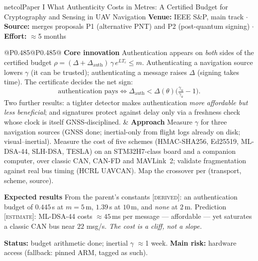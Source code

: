 \documentclass[10pt,a4paper]{article}
\newcommand{\hd}[1]{\textcolor{netcol}{\textbf{#1}}\enspace}
\newcommand{\prov}[1]{\textsc{\footnotesize[#1]}}
\begin{document}
\begin{card}{netcol}{Paper I}
  {What Authenticity Costs in Metres: A Certified Budget for Cryptography and
   Sensing in UAV Navigation}
  {}
\textbf{Venue:} IEEE S\&P, main track \enspace$\cdot$\enspace
\textbf{Source:} merges proposals P1 (alternative PNT) and P2 (post-quantum
signing) \enspace$\cdot$\enspace \textbf{Effort:} $\approx$5 months

\begin{tabularx}{\linewidth}{@{}P{0.485\linewidth}@{\hspace{0.03\linewidth}}P{0.485\linewidth}@{}}
\hd{Core innovation} Authentication appears on \emph{both} sides of the
certified budget $\rho=(\Delta+\Delta_{\mathrm{auth}})\,\gamma\,e^{LT_c}\le m$.
Authenticating a navigation source lowers $\gamma$ (it can be trusted);
authenticating a message raises $\Delta$ (signing takes time). The certificate
decides the net sign:
\[
\text{authentication pays}\iff
\Delta_{\mathrm{auth}}<\Delta(\theta)\Big(\tfrac{\gamma_u}{\gamma_a}-1\Big).
\]
Two further results: a tighter detector makes authentication \emph{more
affordable but less beneficial}; and signatures protect against delay only via
a freshness check whose clock is itself GNSS-disciplined.
&
\hd{Approach} Measure $\gamma$ for three navigation sources (GNSS done;
inertial-only from flight logs already on disk; visual--inertial). Measure the
cost of five schemes (HMAC-SHA256, Ed25519, ML-DSA-44, SLH-DSA, TESLA) on an
STM32H7-class board and a companion computer, over classic CAN, CAN-FD and
MAVLink~2; validate fragmentation against real bus timing (HCRL UAVCAN). Map
the crossover per (transport, scheme, source).

\hd{Expected results} From the parent's constants \prov{derived}: an
authentication budget of $0.445$\,s at $m{=}5$\,m, $1.39$\,s at $10$\,m, and
\emph{none} at $2$\,m. Prediction \prov{estimate}: ML-DSA-44 costs
${\approx}45$\,ms per message --- affordable --- yet saturates a classic CAN bus
near $22$ msg/s. \emph{The cost is a cliff, not a slope.}
\end{tabularx}
\textbf{Status:} budget arithmetic done; inertial $\gamma$ $\approx$1 week.
\textbf{Main risk:} hardware access (fallback: pinned ARM, tagged as such).
\end{card}
\end{document}
